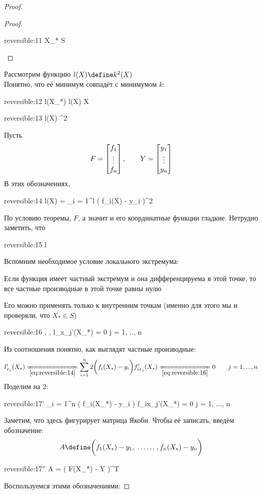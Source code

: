 \begin{proof}
\begin{proof}
		\begin{equ}{reversible:11}
			X_* \in S
		\end{equ}
	\end{proof}
	Рассмотрим функцию $ l(X) \define k^2(X) $ \\
	Понятно, что её минимум совпадёт с минимумом $ k $:
	\begin{equ}{reversible:12}
		l(X_*) \le l(X) \quad \forall X \in {}
	\end{equ}
	\begin{equ}{reversible:13}
		l(X)  ^2
	\end{equ}
	Пусть
	$$ F =  \begin{bmatrix} {f_1} \\ \vdots \\ {f_n} \end{bmatrix} , \qquad Y =  \begin{bmatrix} {y_1} \\ \vdots \\ {y_n} \end{bmatrix}  $$
	В этих обозначениях,
	\begin{equ}{reversible:14}
		 \implies l(X) = \sum_{i = 1}^l \bigg( f_i(X) - y_i \bigg)^2
	\end{equ}
	По условию теоремы, $ F $, а значит и его координатные функции гладкие. Нетрудно заметить, что
	\begin{equ}{reversible:15}
		l \in {}
	\end{equ}
	Вспомним необходимое условие локального экстремума:
	\begin{remind}
		Если функция имеет частный экстремум и она дифференцируема в этой точке, то все частные производные в этой точке равны нулю
	\end{remind}
	Его можно применять только к внутренним точкам (именно для этого мы и проверяли, что $ X_* \in S $)
	\begin{equ}{reversible:16}
		, ,  \implies l_{x_j}'(X_*) = 0 \qquad j = 1, .., n
	\end{equ}
	Из соотношения  понятно, как выглядят частные производные:
	$$ l_{x_j}'(X_*) \undereq{\eref{reversible:14}} \sum_{i = 1}^n 2 \bigg( f_i(X_*) - y_i \bigg) f_{ix_j}'(X_*) \undereq{\eref{reversible:16}} 0 \qquad j = 1, ..., n $$
	Поделим на 2:
	\begin{equ}{reversible:17'}
		\sum_{i = 1}^n \bigg( f_i(X_*) - y_i \bigg) f_{ix_j}'(X_*) = 0 \qquad j = 1, ..., n
	\end{equ}
	Заметим, что здесь фигурирует матрица Якоби. Чтобы её записать, введём обозначение:
	$$ A \define \bigg( f_1(X_*) - y_1, \widedots[3em], f_n(X_*) - y_n \bigg) $$
	\begin{equ}{reversible:17''}
		A = \bigg( F(X_*) - Y \bigg)^T
	\end{equ}
	Воспользуемся этими обозначениями:

\end{proof}
